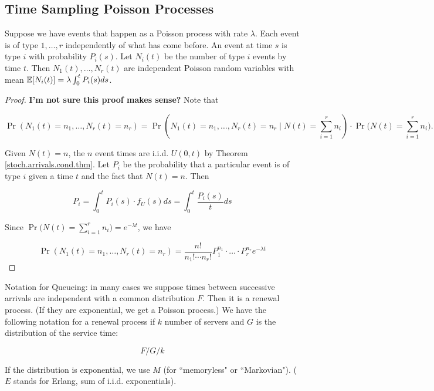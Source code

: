 \subsection{Time Sampling Poisson Processes}

\begin{proposition}\label{stoch.ross.prop.5.3} Suppose we have events that happen as a Poisson process with rate \(\lambda\). Each event is of type \(1, \ldots, r\) independently of what has come before. An event at time \(s\) is type \(i\) with probability \(P_i(s) \). Let \(N_i(t)\) be the number of type \(i\) events by time \(t\). Then \(N_1(t), \ldots, N_r(t)\) are independent Poisson random variables with mean \(\mathbb{E}[N_i(t)] = \lambda \int_0^t P_i(s) ds\).

\end{proposition}

\begin{proof} \textbf{I'm not sure this proof makes sense?} Note that

\[
\Pr(N_1(t) = n_1, \ldots, N_r(t) = n_r) = \Pr(N_1(t) = n_1,  \ldots, N_r(t) = n_r \mid N(t) = \sum_{i=1}^r n_i)  \cdot \Pr \bigg( N(t) = \sum_{i=1}^r n_i \bigg) .
\]

Given \(N(t) = n\), the \(n\) event times are i.i.d. \(U(0,t)\) by Theorem \ref{stoch.arrivals.cond.thm}. Let \(P_i\) be the probability that a particular event is of type \(i\) given a time \(t\) and the fact that \(N(t) = n\). Then

\[
P_i  = \int_0^t P_i(s) \cdot f_U(s) ds = \int_0^t \frac{P_i(s)}{t} ds
\]

Since \( \Pr \bigg( N(t) = \sum_{i=1}^r n_i \bigg) = e^{-\lambda t}\), we have

\[
\Pr(N_1(t) = n_1, \ldots, N_r(t) = n_r) = \frac{n!}{n_1! \cdots n_r!} P_1^{n_1} \cdot \ldots \cdot P_r^{n_r} e^{-\lambda t}
\]

\end{proof}

\begin{remark} Notation for Queueing: in many cases we suppose times between successive arrivals are independent with a common distribution \(F\). Then it is a renewal process. (If they are exponential, we get a Poisson process.) We have the following notation for a renewal process if \(k\) number of servers and \(G\) is the distribution of the service time:

\[
F  / G / k
\]

If the distribution is exponential, we use \(M\) (for ``memoryless" or ``Markovian"). (\(E\) stands for Erlang, sum of i.i.d. exponentials).
\end{remark}

